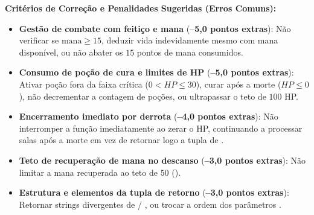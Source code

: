 \vspace{0.2cm}
\textbf{Critérios de Correção e Penalidades Sugeridas (Erros Comuns):}
\begin{itemize}[leftmargin=*, noitemsep, topsep=1pt]
    \item \textbf{Gestão de combate com feitiço e mana} (\textbf{--5,0 pontos extras}): Não verificar se $\text{mana} \ge 15$, deduzir vida indevidamente mesmo com mana disponível, ou não abater os $15$ pontos de mana consumidos.
    \item \textbf{Consumo de poção de cura e limites de HP} (\textbf{--5,0 pontos extras}): Ativar poção fora da faixa crítica ($0 < HP \le 30$), curar após a morte ($HP \le 0$), não decrementar a contagem de poções, ou ultrapassar o teto de $100$ HP.
    \item \textbf{Encerramento imediato por derrota} (\textbf{--4,0 pontos extras}): Não interromper a função imediatamente ao zerar o HP, continuando a processar salas após a morte em vez de retornar logo a tupla de .
    \item \textbf{Teto de recuperação de mana no descanso} (\textbf{--3,0 pontos extras}): Não limitar a mana recuperada ao teto de $50$ ().
    \item \textbf{Estrutura e elementos da tupla de retorno} (\textbf{--3,0 pontos extras}): Retornar strings divergentes de  / , ou trocar a ordem dos parâmetros .
\end{itemize}
\else
\clearpage
{}
\clearpage
{}
\clearpage
\fi
